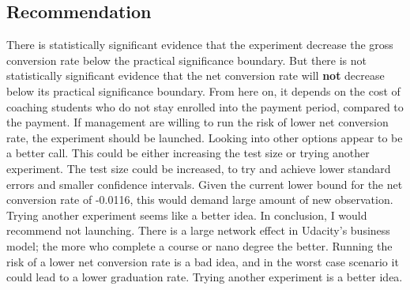 \documentclass[12pt]{article}
\begin{document}
\subsection{Recommendation}
There is statistically significant evidence that the experiment decrease the gross conversion rate below the practical significance boundary. But there is not statistically significant evidence that the net conversion rate will \textbf{not} decrease below its practical significance boundary. 
From here on, it depends on the cost of coaching students who do not stay enrolled into the payment period, compared to the payment. If management are willing to run the risk of lower net conversion rate, the experiment should be launched.
\newline
Looking into other options appear to be a better call. This could be either increasing the test size or trying another experiment. The test size could be increased, to try and achieve lower standard errors and smaller confidence intervals. Given the current lower bound for the net conversion rate of -0.0116, this would demand large amount of new observation. Trying another experiment seems like a better idea.
\newline
In conclusion, I would recommend not launching. There is a large network effect in Udacity's business model; the more who complete a course or nano degree the better. Running the risk of a lower net conversion rate is a bad idea, and in the worst case scenario it could lead to a lower graduation rate. Trying another experiment is a better idea.
\end{document}
